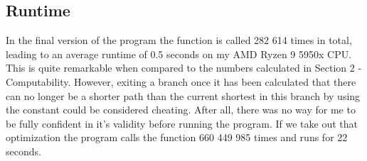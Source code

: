 \documentclass[12pt]{article}
\begin{document}
\newpage
\subsection{Runtime}
In the final version of the program the  function is called  282 614 times in total, leading to an average runtime of 0.5 seconds on my AMD Ryzen 9 5950x CPU. This is quite remarkable when compared to the numbers calculated in Section 2 - Computability. However, exiting a branch once it has been calculated that there can no longer be a shorter path than the current shortest in this branch by using the   constant could be considered cheating. After all, there was no way for me to be fully confident in it's validity before running the program.
If we take out that optimization the program calls the function 660 449 985 times and runs for 22 seconds.
\end{document}
